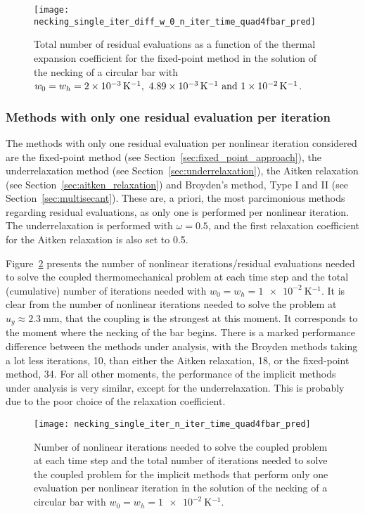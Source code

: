 \begin{figure}[htbp]
  \centering
  \texttt{[image: necking\_single\_iter\_diff\_w\_0\_n\_iter\_time\_quad4fbar\_pred]}
  \caption{Total number of residual evaluations as a function of the thermal expansion coefficient for the fixed-point method in the solution of the necking of a circular bar with \(w_0=w_h=\SIlist{2e-3; 4.89e-3; 1e-2}{\kelvin^{-1}}\).}
\label{fig:necking_single_iter_diff_w_0_n_iter_time_quad4fbar_pred}
\end{figure}

\subsubsection{Methods with only one residual evaluation per iteration}

The methods with only one residual evaluation per nonlinear iteration considered are the fixed-point method (see Section~\ref{sec:fixed_point_approach}), the underrelaxation method (see Section~\ref{sec:underrelaxation}), the Aitken relaxation (see Section~\ref{sec:aitken_relaxation}) and Broyden's method, Type I and II (see Section~\ref{sec:multisecant}).
These are, a priori, the most parcimonious methods regarding residual evaluations, as only one is performed per nonlinear iteration.
The underrelaxation is performed with \(\omega = 0.5\), and the first relaxation coefficient for the Aitken relaxation is also set to 0.5.

Figure~\ref{fig:necking_single_iter_n_iter_time_quad4fbar_pred} presents the number of nonlinear iterations/residual evaluations needed to solve the coupled thermomechanical problem at each time step and the total (cumulative) number of iterations needed with \(w_0=w_h=\SI{1e-2}{\kelvin^{-1}}\).
It is clear from the number of nonlinear iterations needed to solve the problem at \(u_y\approx\SI{2.3}{\milli\meter}\), that the coupling is the strongest at this moment.
It corresponds to the moment where the necking of the bar begins.
There is a marked performance difference between the methods under analysis, with the Broyden methods taking a lot less iterations, 10, than either the Aitken relaxation, 18, or the fixed-point method, 34.
For all other moments, the performance of the implicit methods under analysis is very similar, except for the underrelaxation.
This is probably due to the poor choice of the relaxation coefficient.

\begin{figure}[htbp]
  \centering
  \texttt{[image: necking\_single\_iter\_n\_iter\_time\_quad4fbar\_pred]}
  \caption{Number of nonlinear iterations needed to solve the coupled problem at each time step and the total number of iterations needed to solve the coupled problem for the implicit methods that perform only one evaluation per nonlinear iteration in the solution of the necking of a circular bar with \(w_0=w_h=\SI{1e-2}{\kelvin^{-1}}\).}
\label{fig:necking_single_iter_n_iter_time_quad4fbar_pred}
\end{figure}

